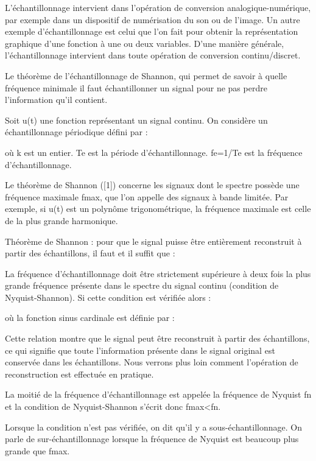 \documentclass[conference,onecolumn]{IEEEtran}
\begin{document}
L'échantillonnage intervient dans l'opération de conversion analogique-numérique, par exemple dans un dispositif de numérisation du son ou de l'image. Un autre exemple d'échantillonnage est celui que l'on fait pour obtenir la représentation graphique d'une fonction à une ou deux variables. D'une manière générale, l'échantillonnage intervient dans toute opération de conversion continu/discret. 

Le théorème de l'échantillonnage de Shannon, qui permet de savoir à quelle fréquence minimale il faut échantillonner un signal pour ne pas perdre l'information qu'il contient. 

Soit u(t) une fonction représentant un signal continu. On considère un échantillonnage périodique défini par : 

 

où k est un entier. Te est la période d'échantillonnage. fe=1/Te est la fréquence d'échantillonnage. 

Le théorème de Shannon ([1]) concerne les signaux dont le spectre possède une fréquence maximale fmax, que l'on appelle des signaux à bande limitée. Par exemple, si u(t) est un polynôme trigonométrique, la fréquence maximale est celle de la plus grande harmonique. 

Théorème de Shannon : pour que le signal puisse être entièrement reconstruit à partir des échantillons, il faut et il suffit que : 

 

La fréquence d'échantillonnage doit être strictement supérieure à deux fois la plus grande fréquence présente dans le spectre du signal continu (condition de Nyquist-Shannon). Si cette condition est vérifiée alors : 

 

où la fonction sinus cardinale est définie par : 

 

Cette relation montre que le signal peut être reconstruit à partir des échantillons, ce qui signifie que toute l'information présente dans le signal original est conservée dans les échantillons. Nous verrons plus loin comment l'opération de reconstruction est effectuée en pratique. 

La moitié de la fréquence d'échantillonnage est appelée la fréquence de Nyquist fn et la condition de Nyquist-Shannon s'écrit donc fmax<fn. 

Lorsque la condition n'est pas vérifiée, on dit qu'il y a sous-échantillonnage. On parle de sur-échantillonnage lorsque la fréquence de Nyquist est beaucoup plus grande que fmax. 
\end{document}
